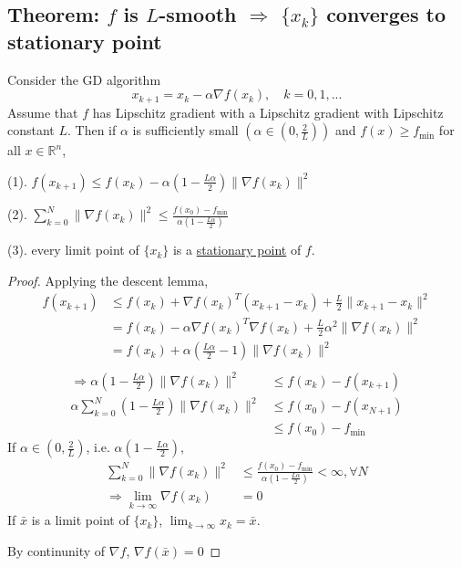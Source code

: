 \documentclass[11pt]{elegantbook}
\begin{document}
\subsection{Theorem: $f$ is $L$-smooth $\Rightarrow$ $\{x_k\}$ converges to stationary point}
\begin{theorem}
Consider the GD algorithm $$x_{k+1}=x_k-\alpha \nabla f(x_k),\quad k=0,1,...$$
Assume that $f$ has Lipschitz gradient with a Lipschitz gradient with Lipschitz constant $L$. Then if $\alpha$ is sufficiently small $(\alpha\in(0,\frac{2}{L}))$ and $f(x)\geq f_{\min}$ for all $x\in \mathbb{R}^n$,

(1). $f(x_{k+1})\leq f(x_k)-\alpha (1-\frac{L\alpha}{2})\|\nabla f(x_k)\|^2$

(2). $\sum_{k=0}^N\|\nabla f(x_k)\|^2\leq \frac{f(x_0)-f_{\min}}{\alpha(1-\frac{L\alpha}{2})}$

(3). every limit point of $\{x_k\}$ is a \underline{stationary point} of $f$.
\end{theorem}
\begin{proof}
    Applying the descent lemma,
    \begin{equation}
        \begin{aligned}
            f(x_{k+1})&\leq f(x_k)+\nabla f(x_k)^T(x_{k+1}-x_k)+\frac{L}{2}\|x_{k+1}-x_k\|^2\\
            &=f(x_k)-\alpha\nabla f(x_k)^T \nabla f(x_k)+\frac{L}{2}\alpha^2\|\nabla f(x_k)\|^2\\
            &=f(x_k)+\alpha (\frac{L\alpha}{2}-1)\|\nabla f(x_k)\|^2\\
        \end{aligned}
        \nonumber
    \end{equation}
    \begin{equation}
        \begin{aligned}
            \Rightarrow	\alpha (1-\frac{L\alpha}{2})\|\nabla f(x_k)\|^2&\leq f(x_k)-f(x_{k+1})\\
            \alpha \sum_{k=0}^N(1-\frac{L\alpha}{2})\|\nabla f(x_k)\|^2&\leq f(x_0)-f(x_{N+1})\\
            &\leq f(x_0)-f_{\min}
        \end{aligned}
        \nonumber
    \end{equation}
    If $\alpha\in(0,\frac{2}{L})$, i.e. $\alpha(1-\frac{L\alpha}{2})$,
    \begin{equation}
        \begin{aligned}
            \sum_{k=0}^N\|\nabla f(x_k)\|^2&\leq \frac{f(x_0)-f_{\min}}{\alpha(1-\frac{L\alpha}{2})}<\infty,\forall N\\
            \Rightarrow	\lim_{k \rightarrow	\infty}\nabla f(x_k)&=0
        \end{aligned}
        \nonumber
    \end{equation}
    If $\bar{x}$ is a limit point of $\{x_k\}$, $\lim_{k \rightarrow \infty}x_k=\bar{x}$.

    By continunity of $\nabla f$, $\nabla f(\bar{x})=0$
\end{proof}
\end{document}

